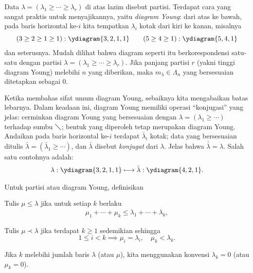 Data $\lambda = (\lambda_1 \geq \cdots \geq \lambda_r)$ di atas lazim disebut partisi. Terdapat cara yang sangat praktis untuk menyajikannya, yaitu \emph{diagram Young}: dari atas ke bawah, pada baris horizontal ke-$i$ kita tempatkan $\lambda_i$ kotak dari kiri ke kanan, misalnya  
\begin{equation*}
	(3 \geq 2 \geq 1 \geq 1): \ydiagram{3,2,1,1} \qquad (5 \geq 4 \geq 1): \ydiagram{5,4,1}
\end{equation*}
dan seterusnya. Mudah dilihat bahwa diagram seperti itu berkorespondensi satu-satu dengan partisi $\lambda = (\lambda_1 \geq \cdots \geq \lambda_r)$. Jika panjang partisi $r$ (yakni tinggi diagram Young) melebihi $n$ yang diberikan, maka $m_\lambda \in \Lambda_n$ yang bersesuaian ditetapkan sebagai $0$.

Ketika membahas sifat umum diagram Young, sebaiknya kita mengabaikan batas lebarnya. Dalam keadaan ini, diagram Young memiliki operasi ``konjugasi'' yang jelas: cerminkan diagram Young yang bersesuaian dengan $\lambda = (\lambda_1 \geq \cdots)$ terhadap sumbu $\diagdown$; bentuk yang diperoleh tetap merupakan diagram Young. Andaikan pada baris horizontal ke-$i$ terdapat $\bar{\lambda}_i$ kotak; data yang bersesuaian ditulis $\bar{\lambda} = (\bar{\lambda}_1 \geq \cdots)$, dan $\bar{\lambda}$ disebut \emph{konjugat} dari $\lambda$. Jelas bahwa $\overline{\overline{\lambda}} = \lambda$. Salah satu contohnya adalah:
\[ \lambda: \ydiagram{3,2,1,1} \longmapsto \bar{\lambda}: \ydiagram{4,2,1}. \]

\begin{definition}
	Untuk partisi atau diagram Young, definisikan
	\begin{compactdesc}
		\item[urutan dominasi] Tulis $\mu \leq \lambda$ jika untuk setiap $k$ berlaku
			\begin{gather}\label{eqn:dominance-order}
				\mu_1 + \cdots + \mu_k \leq \lambda_1 + \cdots + \lambda_k,
			\end{gather}
		\item[urutan leksikografis] Tulis $\mu \prec \lambda$ jika terdapat $k \geq 1$ sedemikian sehingga
			\[1 \leq i < k \implies \mu_i = \lambda_i, \quad \mu_k < \lambda_k. \]
	\end{compactdesc}
	Jika $k$ melebihi jumlah baris $\lambda$ (atau $\mu$), kita menggunakan konvensi $\lambda_k=0$ (atau $\mu_k=0$).
\end{definition}

